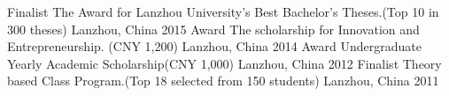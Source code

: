\begin{cvhonors}
  \cvhonor
    {Finalist}
    {The Award for Lanzhou University's Best Bachelor's Theses.(Top 10 in 300 theses)}
    {Lanzhou, China}
    {2015}
  \cvhonor
    {Award}
    {The scholarship for Innovation and Entrepreneurship. (CNY 1,200) }
    {Lanzhou, China}
    {2014}
  \cvhonor
    {Award}
    {Undergraduate Yearly Academic Scholarship(CNY 1,000)}
    {Lanzhou, China}
    {2012}
  \cvhonor
    {Finalist}
    {Theory based Class Program.(Top 18 selected from 150 students)}
    {Lanzhou, China}
    {2011}
\end{cvhonors}
